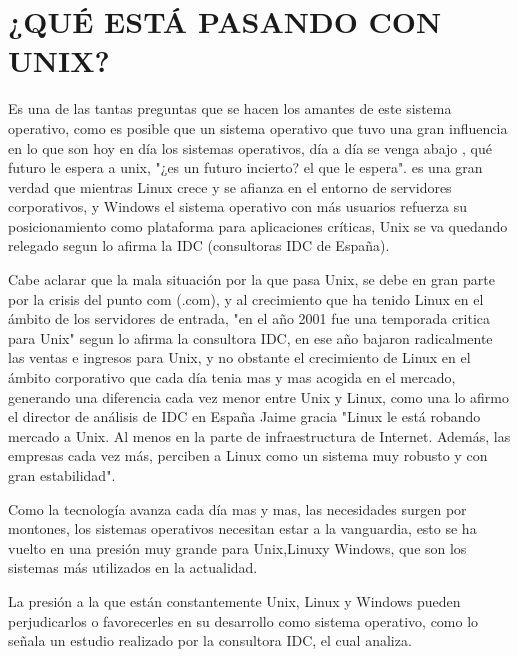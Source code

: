 \section*{¿QUÉ  ESTÁ PASANDO  CON UNIX?}
Es  una de las tantas preguntas que   se hacen  los amantes de este sistema  operativo, como es posible  que  un sistema operativo  que  tuvo una gran influencia  en lo que  son 
hoy en día los sistemas  operativos,  día a día  se  venga  abajo , qué  futuro le  espera  a unix, "¿es  un futuro incierto? el que le espera". 	
es  una gran verdad que  mientras  Linux crece y se  afianza  en  el entorno de servidores corporativos, y  Windows   el sistema operativo con más  usuarios  refuerza  su  
posicionamiento como plataforma para aplicaciones  críticas, Unix  se  va quedando  relegado segun lo  afirma la  IDC (consultoras IDC de España).                                       

Cabe  aclarar que la mala situación por la que pasa Unix, se  debe en gran parte  por la  crisis  del punto com (.com), y  al crecimiento que  ha tenido   Linux  en el ámbito de 
los servidores de entrada, "en el  año 2001  fue una temporada  critica para  Unix"  segun lo afirma  la consultora IDC,  en ese  año bajaron radicalmente las  ventas  e  
ingresos   para  Unix, y  no obstante el crecimiento de  Linux  en el ámbito corporativo   que  cada día tenia mas  y mas acogida en el mercado, generando  una diferencia  cada 
vez menor  entre Unix  y Linux, como una lo afirmo el director de análisis de IDC en España Jaime gracia "Linux le está  robando mercado a Unix. Al menos en la parte de 
infraestructura de Internet. Además, las empresas cada vez más, perciben a Linux como un sistema muy robusto y con gran estabilidad".  	

Como la tecnología  avanza cada día mas y mas, las necesidades surgen por montones, los sistemas operativos necesitan estar a la vanguardia, esto se ha vuelto en una presión  muy 
grande para  Unix,Linuxy  Windows, que son los sistemas más utilizados  en la  actualidad.

La presión a la  que están constantemente Unix, Linux y Windows  pueden perjudicarlos o favorecerles en su desarrollo como  sistema operativo, como lo señala  un  estudio 
realizado por la consultora IDC, el cual analiza. 


